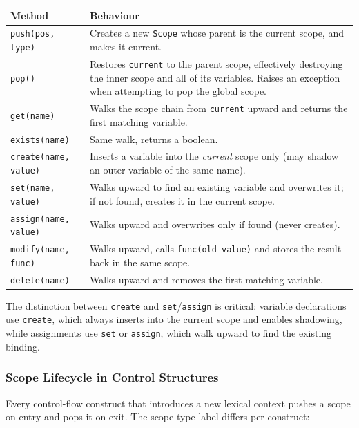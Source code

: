 \begin{center}
\begin{tabular}{|l|p{9.5cm}|}
\hline
\textbf{Method} & \textbf{Behaviour} \\
\hline
\texttt{push(pos, type)} & Creates a new \texttt{Scope} whose parent is the current scope, and makes it current. \\
\hline
\texttt{pop()} & Restores \texttt{current} to the parent scope, effectively destroying the inner scope and all of its variables. Raises an exception when attempting to pop the global scope. \\
\hline
\texttt{get(name)} & Walks the scope chain from \texttt{current} upward and returns the first matching variable. \\
\hline
\texttt{exists(name)} & Same walk, returns a boolean. \\
\hline
\texttt{create(name, value)} & Inserts a variable into the \emph{current} scope only (may shadow an outer variable of the same name). \\
\hline
\texttt{set(name, value)} & Walks upward to find an existing variable and overwrites it; if not found, creates it in the current scope. \\
\hline
\texttt{assign(name, value)} & Walks upward and overwrites only if found (never creates). \\
\hline
\texttt{modify(name, func)} & Walks upward, calls \texttt{func(old\_value)} and stores the result back in the same scope. \\
\hline
\texttt{delete(name)} & Walks upward and removes the first matching variable. \\
\hline
\end{tabular}
\end{center}

The distinction between \texttt{create} and \texttt{set}/\texttt{assign}
is critical: variable declarations use \texttt{create}, which always
inserts into the current scope and enables shadowing, while assignments
use \texttt{set} or \texttt{assign}, which walk upward to find the
existing binding.

\subsubsection{Scope Lifecycle in Control Structures}

Every control-flow construct that introduces a new lexical context
pushes a scope on entry and pops it on exit.  The scope type label
differs per construct:


